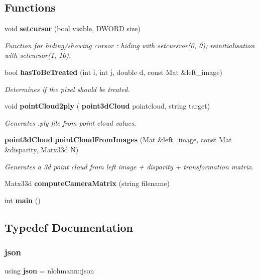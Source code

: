 \subsection*{Functions}
\begin{DoxyCompactItemize}
\item 
void \textbf{ setcursor} (bool visible, D\+W\+O\+RD size)
\begin{DoxyCompactList}\small\item\em Function for hiding/showing cursor \+: hiding with setcursror(0, 0); reinitialisation with setcursor(1, 10). \end{DoxyCompactList}\item 
bool \textbf{ has\+To\+Be\+Treated} (int i, int j, double d, const Mat \&left\+\_\+image)
\begin{DoxyCompactList}\small\item\em Determines if the pixel should be treated. \end{DoxyCompactList}\item 
void \textbf{ point\+Cloud2ply} (\textbf{ point3d\+Cloud} pointcloud, string target)
\begin{DoxyCompactList}\small\item\em Generates .ply file from point cloud values. \end{DoxyCompactList}\item 
\textbf{ point3d\+Cloud} \textbf{ point\+Cloud\+From\+Images} (Mat \&left\+\_\+image, const Mat \&disparity, Matx33d N)
\begin{DoxyCompactList}\small\item\em Generates a 3d point cloud from left image + disparity + transformation matrix. \end{DoxyCompactList}\item 
Matx33d \textbf{ compute\+Camera\+Matrix} (string filename)
\item 
int \textbf{ main} ()
\end{DoxyCompactItemize}


\subsection{Typedef Documentation}
\mbox{\label{projet_8cpp_ab701e3ac61a85b337ec5c1abaad6742d}} 
\subsubsection{json}
{\footnotesize\ttfamily using \textbf{ json} =  nlohmann\+::json}



